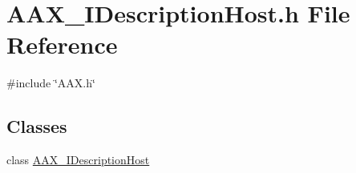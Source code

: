 \hypertarget{a00578}{}\section{A\+A\+X\+\_\+\+I\+Description\+Host.\+h File Reference}
\label{a00578}
{\ttfamily \#include \char`\"{}A\+A\+X.\+h\char`\"{}}\newline
\subsection*{Classes}
\begin{DoxyCompactItemize}
\item 
class \mbox{\hyperlink{a01793}{A\+A\+X\+\_\+\+I\+Description\+Host}}
\end{DoxyCompactItemize}
